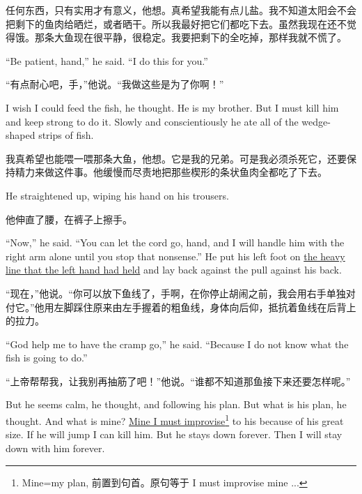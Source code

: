 \begin{paracol}{2}
\switchcolumn

任何东西，只有实用才有意义，他想。真希望我能有点儿盐。我不知道太阳会不会把剩下的鱼肉给晒烂，或者晒干。所以我最好把它们都吃下去。虽然我现在还不觉得饿。那条大鱼现在很平静，很稳定。我要把剩下的全吃掉，那样我就不慌了。

\switchcolumn*

``Be patient, hand,'' he said. ``I do this for you.''

\switchcolumn

“有点耐心吧，手，”他说。“我做这些是为了你啊！”

\switchcolumn*

I wish I could feed the fish, he thought. He is my brother. But I must kill
him and keep strong to do it. Slowly and \gls{conscientiously} he ate all of
the wedge-shaped strips of fish.

\switchcolumn

我真希望也能喂一喂那条大鱼，他想。它是我的兄弟。可是我必须杀死它，还要保持精力来做这件事。他缓慢而尽责地把那些楔形的条状鱼肉全都吃了下去。

\switchcolumn*

He straightened up, wiping his hand on his trousers.

\switchcolumn

他伸直了腰，在裤子上擦手。

\switchcolumn*

``Now,'' he said. ``You can let the cord go, hand, and I will handle him
with the right arm alone until you stop that \gls{nonsense}.'' He put his
left foot on \uline{the heavy line that the left hand had held} and lay back
against the pull against his back.

\switchcolumn

“现在，”他说。“你可以放下鱼线了，手啊，在你停止胡闹之前，我会用右手单独对付它。”他用左脚踩住原来由左手握着的粗鱼线，身体向后仰，抵抗着鱼线在后背上的拉力。

\switchcolumn*

``God help me to have the cramp go,'' he said. ``Because I do not know what
the fish is going to do.''

\switchcolumn

“上帝帮帮我，让我别再抽筋了吧！”他说。“谁都不知道那鱼接下来还要怎样呢。”

\switchcolumn*

But he seems calm, he thought, and following his plan. But what is his plan,
he thought. And what is mine? \uline{Mine I must improvise}\footnote{Mine=my
  plan, 前置到句首。原句等于 I must improvise mine ...} to his because of
his great size. If he will jump I can kill him. But he stays down forever.
Then I will stay down with him forever.


\end{paracol}
